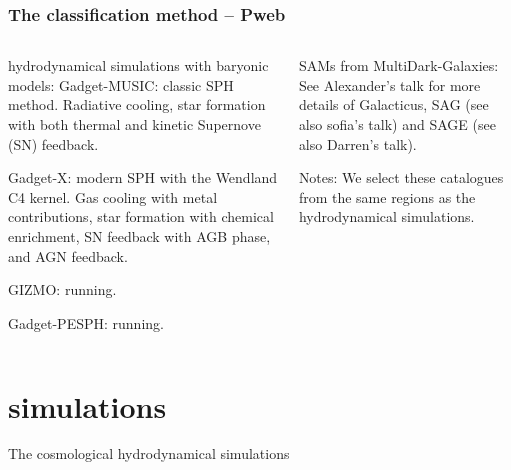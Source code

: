 \documentclass[aspectratio=1610]{beamer}
\begin{document}
\begin{frame}
  \frametitle{The classification method -- Pweb}
  \begin{columns}[t]
    \begin{column}{0.55\textwidth}
      \begin{block}{hydrodynamical simulations with baryonic models:}
        {\sc Gadget-\alert{MUSIC}}: classic SPH method. Radiative cooling, star formation with both thermal and kinetic Supernove (SN) feedback.

        {\sc Gadget-\alert{X}}: modern SPH with the Wendland C4 kernel. Gas cooling with metal contributions, star formation with chemical enrichment, SN feedback with AGB phase, and AGN feedback.

        {\sc GIZMO:} running.

        {\sc Gadget-PESPH:} running.
      \end{block}
    \end{column}
    \begin{column}{0.4\textwidth}
      \begin{block}{SAMs from MultiDark-Galaxies:}
        See Alexander's talk for more details of {\sc Galacticus}, {\sc SAG} (see also sofia's talk) and {\sc SAGE} (see also Darren's talk).

        Notes: We select these catalogues from the same regions as the hydrodynamical simulations.
      \end{block}
    \end{column}
  \end{columns}
\end{frame}

\section{simulations}
\begin{frame}{The cosmological hydrodynamical simulations}

\end{frame}
\end{document}
